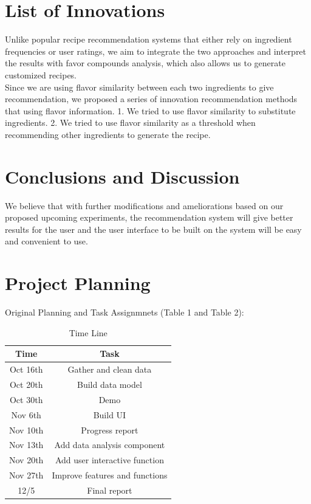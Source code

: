 \documentclass[sigconf]{acmart}
\begin{document}
\section{List of Innovations}
Unlike popular recipe recommendation systems that either rely on ingredient frequencies or user ratings, we aim to integrate the two approaches and interpret the results with favor compounds analysis, which also allows us to generate customized recipes.\\
\indent Since we are using flavor similarity between each two ingredients to give recommendation, we proposed a series of innovation recommendation methods that using flavor information. 1. We tried to use flavor similarity to substitute ingredients. 2. We tried to use flavor similarity as a threshold when recommending other ingredients to generate the recipe.\\

\section{Conclusions and Discussion} 
We believe that with further modifications and ameliorations based on our proposed upcoming experiments, the recommendation system will give better results for the user and the user interface to be built on the system will be easy and convenient to use.\\

\section{Project Planning}

Original Planning and Task Assignmnets (Table 1 and Table 2):
\begin{table}[H]
\begin{center}
\begin{tabular}{ c c }
Time & Task  \\ 
 \hline
Oct 16th & Gather and clean data\\
Oct 20th &Build data model\\
Oct 30th &Demo \\
Nov 6th &Build UI\\
Nov 10th &Progress report \\
Nov 13th &Add data analysis component \\
Nov 20th &Add user interactive function\\
Nov 27th &Improve features and functions\\
12/5 &Final report \\
\end{tabular}
\caption{Time Line}
\end{center}
\end{table}
\end{document}
